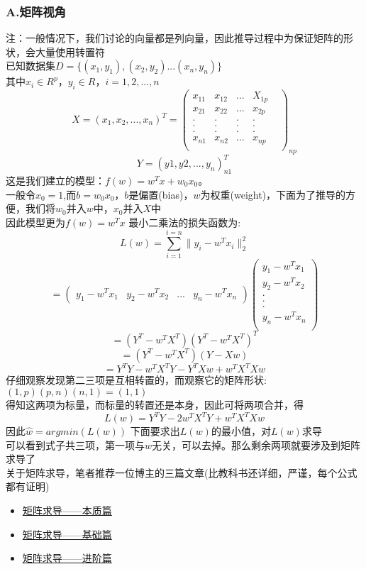 \documentclass{report}
\begin{document}
\subsubsection{A.矩阵视角}
注：一般情况下，我们讨论的向量都是列向量，因此推导过程中为保证矩阵的形状，会大量使用转置符\\
已知数据集$D=\{(x_1,y_1),(x_2,y_2)...(x_n,y_n)\}$\\
其中$x_i\in R^p，y_i\in R，i=1,2,...,n$\\
$$
X=(x_1,x_2,...,x_n)^T=\begin{pmatrix}
x_{11}&x_{12}&...&X_{1p}\\
x_{21}&x_{22}&...&x_{2p}\\
.&.&.&.&\\
.&.&.&.&\\
.&.&.&.&\\
x_{n1}&x_{n2}&...&x_{np}\\
\end{pmatrix}_{np}
$$
$$
Y=(y1,y2,...,y_n)_{n1}^T
$$
这是我们建立的模型：$f(w)=w^Tx+w_0x_0。$\\
一般令$x_0=1$,而$b=w_0x_0$，$b$是偏置(bias)，$w$为权重(weight)，下面为了推导的方便，我们将$w_0$并入$w$中，$x_0$并入$X$中\\
因此模型更为$f(w)=w^Tx$
最小二乘法的损失函数为:
$$
L(w)=\sum_{i=1}^{i=n}\|y_i-w^T x_i\|_2^2
$$
$$
=\begin{pmatrix}
y_1-w^Tx_1&y_2-w^Tx_2&...&y_n-w^Tx_n
\end{pmatrix}
\begin{pmatrix}
y_1-w^Tx_1\\
y_2-w^Tx_2\\
.\\
.\\
.\\
y_n-w^Tx_n\\
\end{pmatrix}
$$
$$
=(Y^T-w^TX^T)(Y^T-w^TX^T)^T
$$
$$
=(Y^T-w^TX^T)(Y-Xw)
$$
$$
=Y^TY-w^TX^TY-Y^TXw+w^TX^TXw
$$
仔细观察发现第二三项是互相转置的，而观察它的矩阵形状: $(1,p)(p,n)(n,1)=(1,1)$\\
得知这两项为标量，而标量的转置还是本身，因此可将两项合并，得
$$
L(w)=Y^TY-2w^TX^TY+w^TX^TXw
$$
因此$\hat{w}=argmin(L(w))$
下面要求出$L(w)$的最小值，对$L(w)$求导\\
可以看到式子共三项，第一项与$w$无关，可以去掉。那么剩余两项就要涉及到矩阵求导了\\
关于矩阵求导，笔者推荐一位博主的三篇文章(比教科书还详细，严谨，每个公式都有证明)
\begin{itemize}
	\item \href{https://zhuanlan.zhihu.com/p/263777564}{矩阵求导——本质篇}
	\item \href{https://zhuanlan.zhihu.com/p/273729929}{矩阵求导——基础篇}
	\item \href{https://zhuanlan.zhihu.com/p/288541909}{矩阵求导——进阶篇}
\end{itemize}
\end{document}
